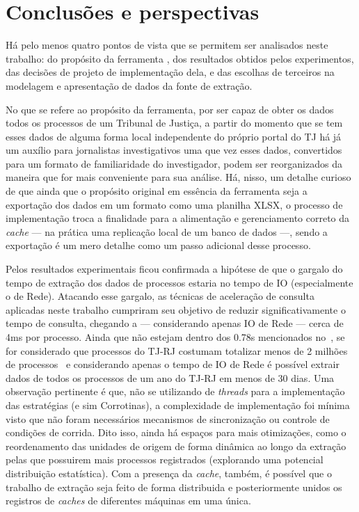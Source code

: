 \chapter{Conclusões e perspectivas~\label{chp:conclusions}}

Há pelo menos quatro pontos de vista que se permitem ser analisados neste
trabalho: do propósito da ferramenta \tjscraper, dos resultados obtidos pelos
experimentos, das decisões de projeto de implementação dela, e das escolhas de
terceiros na modelagem e apresentação de dados da fonte de extração.

No que se refere ao propósito da ferramenta, por ser capaz de obter os dados
todos os processos de um Tribunal de Justiça, a partir do momento que se tem
esses dados de alguma forma local independente do próprio portal do TJ há já um
auxílio para jornalistas investigativos uma que vez esses dados, convertidos
para um formato de familiaridade do investigador, podem ser reorganizados da
maneira que for mais conveniente para sua análise. Há, nisso, um detalhe
curioso de que ainda que o propósito original em essência da ferramenta seja a
exportação dos dados em um formato como uma planilha XLSX, o processo de
implementação troca a finalidade para a alimentação e gerenciamento correto da
\textit{cache} --- na prática uma replicação local de um banco de dados ---,
sendo a exportação é um mero detalhe como um passo adicional desse processo.

Pelos resultados experimentais ficou confirmada a hipótese de que o gargalo do
tempo de extração dos dados de processos estaria no tempo de IO (especialmente
o de Rede). Atacando esse gargalo, as técnicas de aceleração de consulta
aplicadas neste trabalho cumpriram seu objetivo de reduzir significativamente o
tempo de consulta, chegando a --- considerando apenas IO de Rede --- cerca de
4ms por processo. Ainda que não estejam dentro dos 0.78s mencionados
no~, se for considerado que processos do
TJ-RJ costumam totalizar menos de 2 milhões de
processos~\cite{conjur:tj-novos-processos,amaerj:tj-novos-processos} e
considerando apenas o tempo de IO de Rede é possível extrair dados de todos os
processos de um ano do TJ-RJ em menos de 30 dias. Uma observação pertinente é
que, não se utilizando de \textit{threads} para a implementação das estratégias
(e sim Corrotinas), a complexidade de implementação foi mínima visto que não
foram necessários mecanismos de sincronização ou controle de condições de
corrida. Dito isso, ainda há espaços para mais otimizações, como o
reordenamento das unidades de origem de forma dinâmica ao longo da extração
pelas que possuirem mais processos registrados (explorando uma potencial
distribuição estatística). Com a presença da \textit{cache}, também, é possível
que o trabalho de extração seja feito de forma distribuida e posteriormente
unidos os registros de \textit{caches} de diferentes máquinas em uma única.

